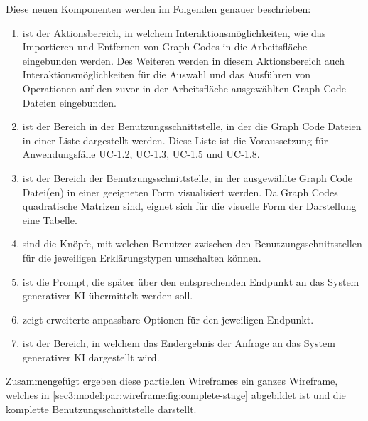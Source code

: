 Diese neuen Komponenten werden im Folgenden genauer beschrieben:
\begin{enumerate}
    \item[\circitem{4}] ist der Aktionsbereich, in welchem Interaktionsmöglichkeiten, wie das Importieren und Entfernen von Graph Codes in die Arbeitsfläche eingebunden werden.
    Des Weiteren werden in diesem Aktionsbereich auch Interaktionsmöglichkeiten für die Auswahl und das Ausführen von Operationen auf den zuvor in der Arbeitsfläche ausgewählten Graph Code Dateien eingebunden.
    \item[\circitem{5}] ist der Bereich in der Benutzungsschnittstelle, in der die Graph Code Dateien in einer Liste dargestellt werden.
    Diese Liste ist die Voraussetzung für Anwendungsfälle \hyperref[sec3:model:uc-1.2]{UC-1.2}, \hyperref[sec3:model:uc-1.3]{UC-1.3}, \hyperref[sec3:model:uc-1.5]{UC-1.5} und \hyperref[sec3:model:uc-1.8]{UC-1.8}.
    \item[\circitem{6}] ist der Bereich der Benutzungsschnittstelle, in der ausgewählte Graph Code Datei(en) in einer geeigneten Form visualisiert werden.
    Da Graph Codes quadratische Matrizen sind, eignet sich für die visuelle Form der Darstellung eine Tabelle.
    \item[\circitem{7}] sind die Knöpfe, mit welchen Benutzer zwischen den Benutzungsschnittstellen für die jeweiligen Erklärungstypen umschalten können.
    \item[\circitem{8}] ist die Prompt, die später über den entsprechenden Endpunkt an das System generativer KI übermittelt werden soll.
    \item[\circitem{9}] zeigt erweiterte anpassbare Optionen für den jeweiligen Endpunkt.
    \item[\circitem{10}] ist der Bereich, in welchem das Endergebnis der Anfrage an das System generativer KI dargestellt wird.
\end{enumerate}
Zusammengefügt ergeben diese partiellen Wireframes ein ganzes Wireframe, welches in \cref{sec3:model:par:wireframe:fig:complete-stage} abgebildet ist und die komplette Benutzungsschnittstelle darstellt.

